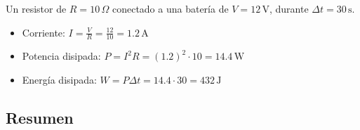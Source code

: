 Un resistor de \( R = 10 \, \Omega \) conectado a una batería de \( V = 12 \, \text{V} \), durante \( \Delta t = 30 \, \text{s} \).
\begin{itemize}
    \item Corriente: \( I = \frac{V}{R} = \frac{12}{10} = 1.2 \, \text{A} \)
    \item Potencia disipada: \( P = I^2 R = (1.2)^2 \cdot 10 = 14.4 \, \text{W} \)
    \item Energía disipada: \( W = P \Delta t = 14.4 \cdot 30 = 432 \, \text{J} \)
\end{itemize}

\subsection{Resumen}
